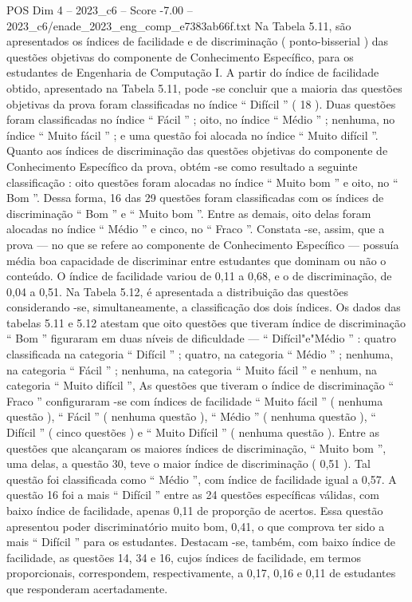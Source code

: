 \begin{textsample}{POS Dim 4 – 2023\_c6 – Score -7.00 – 2023\_c6/enade\_2023\_eng\_comp\_e7383ab66f.txt}
Na Tabela 5.11, são apresentados os índices de facilidade e de discriminação ( ponto-bisserial ) das questões objetivas do componente de Conhecimento Específico, para os estudantes de Engenharia de Computação I.
A partir do índice de facilidade obtido, apresentado na Tabela 5.11, pode -se concluir que a maioria das questões objetivas da prova foram classificadas no índice “ Difícil ” ( 18 ).
Duas questões foram classificadas no índice “ Fácil ” ; oito, no índice “ Médio ” ; nenhuma, no índice “ Muito fácil ” ; e uma questão foi alocada no índice “ Muito difícil ”.
Quanto aos índices de discriminação das questões objetivas do componente de Conhecimento Específico da prova, obtém -se como resultado a seguinte classificação : oito questões foram alocadas no índice “ Muito bom ” e oito, no “ Bom ”.
Dessa forma, 16 das 29 questões foram classificadas com os índices de discriminação “ Bom ” e “ Muito bom ”.
Entre as demais, oito delas foram alocadas no índice “ Médio ” e cinco, no “ Fraco ”.
Constata -se, assim, que a prova — no que se refere ao componente de Conhecimento Específico — possuía média boa capacidade de discriminar entre estudantes que dominam ou não o conteúdo.
O índice de facilidade variou de 0,11 a 0,68, e o de discriminação, de 0,04 a 0,51.
Na Tabela 5.12, é apresentada a distribuição das questões considerando -se, simultaneamente, a classificação dos dois índices.
Os dados das tabelas 5.11 e 5.12 atestam que oito questões que tiveram índice de discriminação “ Bom ” figuraram em duas níveis de dificuldade — “ Difícil"e"Médio ” : quatro classificada na categoria “ Difícil ” ; quatro, na categoria “ Médio ” ; nenhuma, na categoria “ Fácil ” ; nenhuma, na categoria “ Muito fácil ” e nenhum, na categoria “ Muito difícil ”, As questões que tiveram o índice de discriminação “ Fraco ” configuraram -se com índices de facilidade “ Muito fácil ” ( nenhuma questão ), “ Fácil ” ( nenhuma questão ), “ Médio ” ( nenhuma questão ), “ Difícil ” ( cinco questões ) e “ Muito Difícil ” ( nenhuma questão ).
Entre as questões que alcançaram os maiores índices de discriminação, “ Muito bom ”, uma delas, a questão 30, teve o maior índice de discriminação ( 0,51 ).
Tal questão foi classificada como “ Médio ”, com índice de facilidade igual a 0,57.
A questão 16 foi a mais “ Difícil ” entre as 24 questões específicas válidas, com baixo índice de facilidade, apenas 0,11 de proporção de acertos.
Essa questão apresentou poder discriminatório muito bom, 0,41, o que comprova ter sido a mais “ Difícil ” para os estudantes.
Destacam -se, também, com baixo índice de facilidade, as questões 14, 34 e 16, cujos índices de facilidade, em termos proporcionais, correspondem, respectivamente, a 0,17, 0,16 e 0,11 de estudantes que responderam acertadamente.

\end{textsample}
